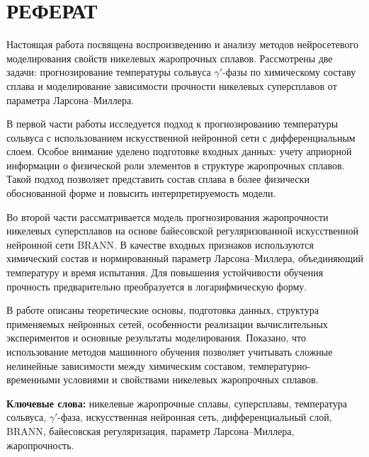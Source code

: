 \chapter*{\centering РЕФЕРАТ}

Настоящая работа посвящена воспроизведению и анализу методов
 нейросетевого моделирования свойств никелевых жаропрочных сплавов. 
 Рассмотрены две задачи: прогнозирование температуры сольвуса
  $\gamma'$-фазы по химическому составу сплава и моделирование
 зависимости прочности никелевых суперсплавов от параметра 
 Ларсона--Миллера.

В первой части работы исследуется подход к прогнозированию
 температуры сольвуса с использованием искусственной нейронной 
 сети с дифференциальным слоем. Особое внимание уделено подготовке
  входных данных: учету априорной информации о физической роли 
  элементов в структуре жаропрочных сплавов. Такой подход 
  позволяет представить состав сплава в более физически 
  обоснованной форме и повысить интерпретируемость модели.

Во второй части рассматривается модель прогнозирования жаропрочности 
никелевых суперсплавов на основе байесовской регуляризованной 
искусственной нейронной сети BRANN. В качестве входных признаков 
используются химический состав и нормированный параметр 
Ларсона--Миллера, объединяющий температуру и время испытания. 
Для повышения устойчивости обучения прочность предварительно 
преобразуется в логарифмическую форму.

В работе описаны теоретические основы, подготовка данных, 
структура применяемых нейронных сетей, особенности реализации 
вычислительных экспериментов и основные результаты моделирования. 
Показано, что использование методов машинного обучения позволяет 
учитывать сложные нелинейные зависимости между химическим составом, 
температурно-временными условиями и свойствами никелевых жаропрочных 
сплавов.

\textbf{Ключевые слова:} никелевые жаропрочные сплавы, суперсплавы, 
температура сольвуса, $\gamma'$-фаза, искусственная нейронная сеть, 
дифференциальный слой, BRANN, байесовская регуляризация, параметр 
Ларсона--Миллера, жаропрочность.
